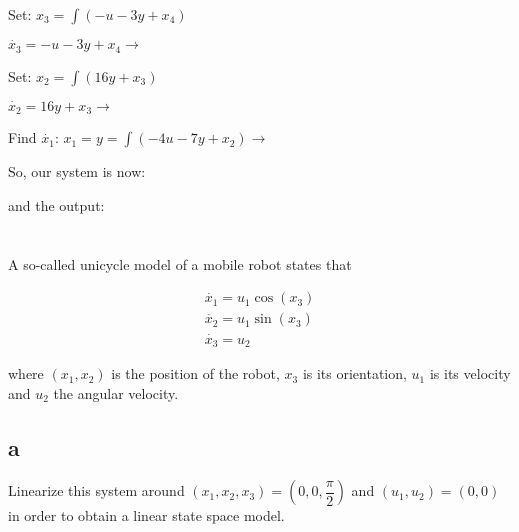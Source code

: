\documentclass[10pt,a4paper]{article}
\begin{document}
Set: $x_{3} = \int (-u-3y + x_{4}) $
\smallskip

$ \dot{x_{3}} = -u-3y + x_{4} \rightarrow$ 

Set: $x_{2} = \int (16y + x_{3}) $
\smallskip

$ \dot{x_{2}} = 16y + x_{3} \rightarrow$ 
\medskip

Find $\dot{x_{1}}$:
$ x_{1} = y = \int (- 4u - 7y + x_{2}) \rightarrow$ 

So, our system is now:
\begin{center}
\end{center}

and the output:

\begin{center}
\end{center}


\section{}
A so-called unicycle model of a mobile robot states that

\[
\begin{matrix}
\dot{x_{1}} = u_{1}\cos(x_{3}) \\
\dot{x_{2}} = u_{1}\sin(x_{3}) \\
\dot{x_{3}} = u_{2}
\end{matrix}
\]

where $(x_{1}, x_{2})$ is the position of the robot, $x_{3}$ is its orientation, $u_{1}$ is its velocity and $u_{2}$ the angular velocity.

\subsection*{a}
Linearize this system around $(x_{1}, x_{2}, x_{3}) = (0,0, \dfrac{\pi}{2})$ and $(u_{1},u_{2}) = (0,0)$ in order to obtain a linear state space model.
\end{document}

